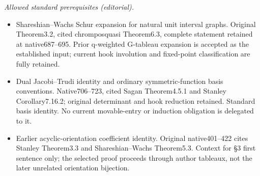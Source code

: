 \documentclass[10pt,a4paper]{amsart}
\theoremstyle{definition}
\theoremstyle{remark}
\numberwithin{equation}{section}
\begin{document}
\noindent\textit{Allowed standard prerequisites (editorial).}\begin{itemize}
\item Shareshian–Wachs Schur expansion for natural unit interval graphs. Original Theorem3.2, cited chromposquasi Theorem6.3, complete statement retained at native687–695. Prior q-weighted G-tableau expansion is accepted as the established input; current hook involution and fixed-point classification are fully retained.
\item Dual Jacobi–Trudi identity and ordinary symmetric-function basis conventions. Native706–723, cited Sagan Theorem4.5.1 and Stanley Corollary7.16.2; original determinant and hook reduction retained. Standard basis identity. No current movable-entry or induction obligation is delegated to it.
\item Earlier acyclic-orientation coefficient identity. Original native401–422 cites Stanley Theorem3.3 and Shareshian–Wachs Theorem5.3. Context for §3 first sentence only; the selected proof proceeds through author tableaux, not the later unrelated orientation bijection.
\end{itemize}\medskip
\end{document}
